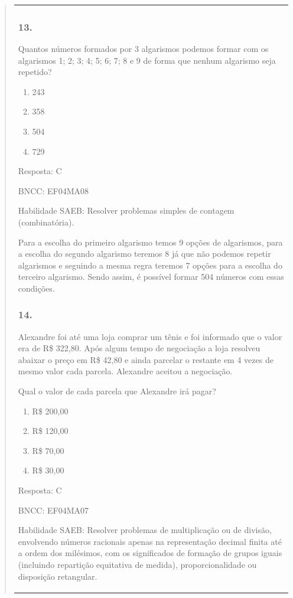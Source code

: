 \begin{enumerate}
\begin{escolha}
\begin{enumerate}
\begin{itemize}
\begin{itemize}
\begin{escolha}
\begin{quote}
\begin{escolha}
{\begin{longtable}[]{@{}l@{}}
\begin{itemize}
\subsubsection{13.}\label{section-199}

Quantos números formados por 3 algarismos podemos formar com os
algarismos 1; 2; 3; 4; 5; 6; 7; 8 e 9 de forma que nenhum algarismo seja
repetido?

\begin{enumerate}
\def\labelenumi{\alph{enumi})}
\item
  243
\item
  358
\item
  504
\item
  729
\end{enumerate}

Resposta: C

BNCC: EF04MA08

Habilidade SAEB: Resolver problemas simples de contagem (combinatória).

Para a escolha do primeiro algarismo temos 9 opções de algarismos, para
a escolha do segundo algarismo teremos 8 já que não podemos repetir
algarismos e seguindo a mesma regra teremos 7 opções para a escolha do
terceiro algarismo. Sendo assim, é possível formar 504 números com essas
condições.

\subsubsection{14.}\label{section-200}

Alexandre foi até uma loja comprar um tênis e foi informado que o valor
era de R\$ 322,80. Após algum tempo de negociação a loja resolveu
abaixar o preço em R\$ 42,80 e ainda parcelar o restante em 4 vezes de
mesmo valor cada parcela. Alexandre aceitou a negociação.

Qual o valor de cada parcela que Alexandre irá pagar?

\begin{enumerate}
\def\labelenumi{\alph{enumi})}
\item
  R\$ 200,00
\item
  R\$ 120,00
\item
  R\$ 70,00
\item
  R\$ 30,00
\end{enumerate}

Resposta: C

BNCC: EF04MA07

Habilidade SAEB: Resolver problemas de multiplicação ou de divisão,
envolvendo números racionais apenas na representação decimal finita até
a ordem dos milésimos, com os significados de formação de grupos iguais
(incluindo repartição equitativa de medida), proporcionalidade ou
disposição retangular.


\end{itemize}
\end{longtable}}
\end{escolha}
\end{quote}
\end{escolha}
\end{itemize}
\end{itemize}
\end{enumerate}
\end{escolha}
\end{enumerate}
